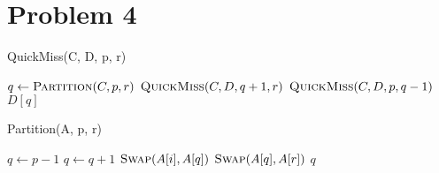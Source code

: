 \documentclass[11pt]{article}
\begin{document}
\section{Problem 4}

\begin{algorithm}
\caption{QuickMiss(C, D, p, r)}\label{QuickMiss}
    \begin{algorithmic}[1]
            \State $q \gets \textsc{Partition}(C, p, r)$
                \State $\textsc{QuickMiss}(C, D, q+1, r)$
            \Else
                \State $\textsc{QuickMiss}(C, D, p, q-1)$
            \EndIf
        \EndIf
            \State \Return $D[q]$
        \EndProcedure
    \end{algorithmic}
\end{algorithm}


\begin{algorithm}
\caption{Partition(A, p, r)}\label{Partition}
    \begin{algorithmic}[1]
        \State $q \gets p-1$
                \State $q \gets q+1$
                \State $\textsc{Swap}(A[i], A[q])$
            \EndIf
        \EndFor
        \State $\textsc{Swap}(A[q], A[r])$ 
        \State \Return $q$
        \EndProcedure
    \end{algorithmic}
\end{algorithm}

%
% 
% 
\end{document}
